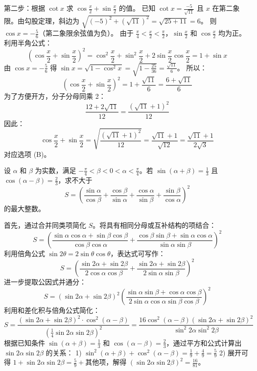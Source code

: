 \begin{questions}
\begin{solution}
第二步：根据 $\cot x$ 求 $\cos \frac{x}{2} + \sin \frac{x}{2}$ 的值。
已知 $\cot x = \frac{-5}{\sqrt{11}}$ 且 $x$ 在第二象限。由勾股定理，斜边为 $\sqrt{(-5)^2 + (\sqrt{11})^2} = \sqrt{25+11} = 6$。
则 $\cos x = -\frac{5}{6}$（第二象限余弦值为负）。
由于 $\frac{\pi}{4} < \frac{x}{2} < \frac{\pi}{2}$，$\sin \frac{x}{2}$ 和 $\cos \frac{x}{2}$ 均为正。
利用半角公式：
\[
\left( \cos \frac{x}{2} + \sin \frac{x}{2} \right)^2 = \cos^2 \frac{x}{2} + \sin^2 \frac{x}{2} + 2 \sin \frac{x}{2} \cos \frac{x}{2} = 1 + \sin x
\]
由 $\cos x = -\frac{5}{6}$ 得 $\sin x = \sqrt{1 - \cos^2 x} = \sqrt{1 - \frac{25}{36}} = \frac{\sqrt{11}}{6}$。
所以：
\[
\left( \cos \frac{x}{2} + \sin \frac{x}{2} \right)^2 = 1 + \frac{\sqrt{11}}{6} = \frac{6 + \sqrt{11}}{6}
\]
为了方便开方，分子分母同乘 2：
\[
\frac{12 + 2\sqrt{11}}{12} = \frac{(\sqrt{11} + 1)^2}{12}
\]
因此：
\[
\cos \frac{x}{2} + \sin \frac{x}{2} = \sqrt{\frac{(\sqrt{11} + 1)^2}{12}} = \frac{\sqrt{11} + 1}{\sqrt{12}} = \frac{\sqrt{11} + 1}{2\sqrt{3}}
\]
对应选项 (B)。
\end{solution}

\question
设 $\alpha$ 和 $\beta$ 为实数，满足 $-\frac{\pi}{4} < \beta < 0 < \alpha < \frac{\pi}{4}$。若 $\sin(\alpha + \beta) = \frac{1}{3}$ 且 $\cos(\alpha - \beta) = \frac{2}{3}$，求不大于
\[
S = \left( \frac{\sin \alpha}{\cos \beta} + \frac{\cos \beta}{\sin \alpha} + \frac{\cos \alpha}{\sin \beta} + \frac{\sin \beta}{\cos \alpha} \right)^2
\]
的最大整数。

\begin{solution}
首先，通过合并同类项简化 $S$。将具有相同分母或互补结构的项结合：
\[
S = \left( \frac{\sin \alpha \cos \alpha + \sin \beta \cos \beta}{\cos \beta \cos \alpha} + \frac{\cos \beta \sin \beta + \sin \alpha \cos \alpha}{\sin \alpha \sin \beta} \right)^2
\]
利用倍角公式 $\sin 2\theta = 2\sin\theta\cos\theta$，表达式可写作：
\[
S = \left( \frac{\sin 2\alpha + \sin 2\beta}{2\cos \alpha \cos \beta} + \frac{\sin 2\alpha + \sin 2\beta}{2\sin \alpha \sin \beta} \right)^2
\]
进一步提取公因式并通分：
\[
S = (\sin 2\alpha + \sin 2\beta)^2 \left( \frac{\sin \alpha \sin \beta + \cos \alpha \cos \beta}{2\sin \alpha \cos \alpha \sin \beta \cos \beta} \right)^2
\]
利用和差化积与倍角公式简化：
\[
S = \frac{(\sin 2\alpha + \sin 2\beta)^2 \cdot \cos^2(\alpha - \beta)}{(\frac{1}{4} \sin 2\alpha \sin 2\beta)^2} = \frac{16 \cos^2(\alpha - \beta) (\sin 2\alpha + \sin 2\beta)^2}{\sin^2 2\alpha \sin^2 2\beta}
\]
根据已知条件 $\sin(\alpha + \beta) = \frac{1}{3}$ 和 $\cos(\alpha - \beta) = \frac{2}{3}$，通过平方和公式计算出 $\sin 2\alpha \sin 2\beta$ 的关系：
1) $\sin^2(\alpha + \beta) + \cos^2(\alpha - \beta) = \frac{1}{9} + \frac{4}{9} = \frac{5}{9}$
2) 展开可得 $1 + \sin 2\alpha \sin 2\beta = \frac{5}{9} + \text{其他项}$，解得 $(\sin 2\alpha \sin 2\beta)^2 = \frac{16}{81}$。


\end{solution}
\end{questions}
